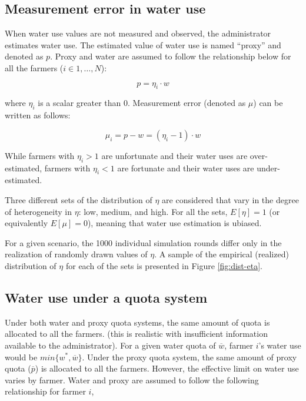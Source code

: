 \documentclass[
]{article}
\begin{document}
\subsection{Measurement error in water use}\label{measurement-error-in-water-use}

When water use values are not measured and observed, the administrator estimates water use. The estimated value of water use is named ``proxy'' and denoted as \(p\). Proxy and water are assumed to follow the relationship below for all the farmers (\(i \in 1,\dots, N\)):

\begin{equation}
p = \eta_i \cdot w
\end{equation}

where \(\eta_i\) is a scalar greater than 0. Measurement error (denoted as \(\mu\)) can be written as follows:

\begin{equation}
\mu_i = p - w = (\eta_i - 1)\cdot w
\end{equation}

While farmers with \(\eta_i > 1\) are unfortunate and their water uses are over-estimated, farmers with \(\eta_i < 1\) are fortunate and their water uses are under-estimated.

Three different sets of the distribution of \(\eta\) are considered that vary in the degree of heterogeneity in \(\eta\): low, medium, and high. For all the sets, \(E[\eta] = 1\) (or equivalently \(E[\mu] = 0\)), meaning that water use estimation is ubiased.

For a given scenario, the 1000 individual simulation rounds differ only in the realization of randomly drawn values of \(\eta\). A sample of the empirical (realized) distribution of \(\eta\) for each of the sets is presented in Figure \ref{fig:dist-eta}.

\subsection{Water use under a quota system}\label{water-use-under-a-quota-system}

Under both water and proxy quota systems, the same amount of quota is allocated to all the farmers. (this is realistic with insufficient information available to the administrator). For a given water quota of \(\overline{w}\), farmer \(i\)'s water use would be \(min\{w^*, \overline{w}\}\). Under the proxy quota system, the same amount of proxy quota (\(\overline{p}\)) is allocated to all the farmers. However, the effective limit on water use varies by farmer. Water and proxy are assumed to follow the following relationship for farmer \(i\),
\end{document}
